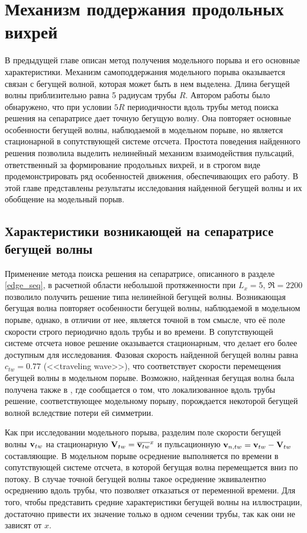 
\chapter{Механизм поддержания продольных вихрей}


В предыдущей главе описан метод получения модельного порыва и его основные характеристики. Механизм самоподдержания модельного порыва оказывается связан с бегущей волной, которая может быть в нем выделена. Длина бегущей волны приблизительно равна 5 радиусам трубы $R$. Автором работы было обнаружено, что при условии $5R$ периодичности вдоль трубы метод поиска решения на сепаратрисе дает точную бегущую волну. Она повторяет основные особенности бегущей волны, наблюдаемой в модельном порыве, но является стационарной в сопутствующей системе отсчета. Простота поведения найденного решения позволила выделить нелинейный механизм взаимодействия пульсаций, ответственный за формирование продольных вихрей, и в строгом виде продемонстрировать ряд особенностей движения, обеспечивающих его работу. В этой главе представлены результаты исследования найденной бегущей волны и их обобщение на модельный порыв. 



\section{Характеристики возникающей на сепаратрисе бегущей волны}

Применение метода поиска решения на сепаратрисе, описанного в разделе \ref{edge_seq}, в расчетной области небольшой протяженности при $L_x = 5$, $\Re = 2200$ позволило получить решение типа нелинейной бегущей волны. Возникающая бегущая волна повторяет особенности бегущей волны, наблюдаемой в модельном порыве, однако, в отличии от нее, является точной в том смысле, что её поле скорости строго периодично вдоль трубы и во времени. В сопутствующей системе отсчета новое решение оказывается стационарным, что делает его более доступным для исследования. Фазовая скорость найденной бегущей волны равна $c_{tw} = 0.77$ (<<traveling wave>>), что соответствует скорости перемещения бегущей волны в модельном порыве. Возможно, найденная бегущая волна была получена также в \cite{Chantry2014}, где сообщается о том, что локализованное вдоль трубы решение, соответствующее модельному порыву, порождается некоторой бегущей волной вследствие потери ей симметрии. 

Как при исследовании модельного порыва, разделим поле скорости бегущей волны $\mathbf{v}_{tw}$ на стационарную $\mathbf{V}_{tw} = \overline{\mathbf{v}_{tw}}^{x}$ и пульсационную $\mathbf{v}_{n,tw} = \mathbf{v}_{tw} - \mathbf{V}_{tw}$ составляющие. В модельном порыве осреднение выполняется по времени в сопутствующей системе отсчета, в которой бегущая волна перемещается вниз по потоку. В случае точной бегущей волны такое осреднение эквивалентно осреднению вдоль трубы, что позволяет отказаться от переменной времени. Для того, чтобы представить средние характеристики бегущей волны на иллюстрации, достаточно привести их значение только в одном сечении трубы, так как они не зависят от $x$.

